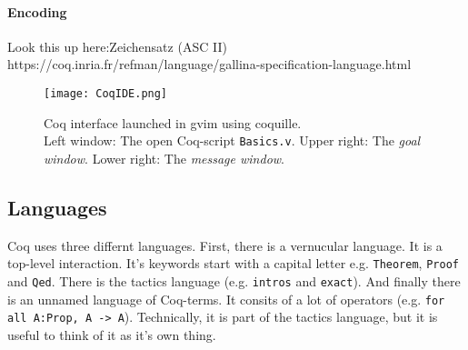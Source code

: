 \paragraph{Encoding }
Look this up here:Zeichensatz (ASC II)\\
https://coq.inria.fr/refman/language/gallina-specification-language.html

\begin{figure}[h]
\texttt{[image: CoqIDE.png]}
\caption{Coq interface launched in gvim using coquille.\\ 
Left window: The open Coq-script \texttt{Basics.v}.
Upper right: The {\itshape goal window}. 
Lower right: The {\itshape message window}.}
\label{fig:Coquille}
\end{figure}

\subsection{Languages}
Coq uses three differnt languages. 
First, there is a vernucular language. 
It is a top-level interaction. 
It's keywords start with a capital letter e.g. \lstinline!Theorem!, \lstinline!Proof! and  \lstinline!Qed!. 
There is the tactics language (e.g. \lstinline!intros! and \lstinline!exact!).
And finally there is an unnamed language of Coq-terms. 
It consits of a lot of operators (e.g. \lstinline!for all A:Prop, A -> A!).
Technically, it is part of the tactics language, but it is useful to think of it as it's own thing.